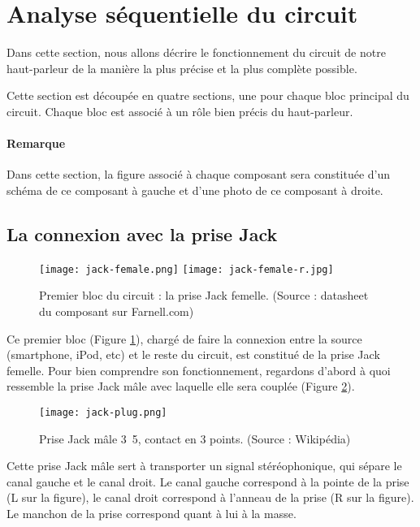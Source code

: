 

\section{Analyse séquentielle du circuit}
Dans cette section, nous allons décrire le fonctionnement du circuit
de notre haut-parleur de la manière la plus précise et la plus complète
possible. 

Cette section est découpée en quatre sections, une pour chaque bloc 
principal du circuit. Chaque bloc est associé à un rôle bien précis du
haut-parleur.

\paragraph{Remarque}
Dans cette section, la figure associé à chaque composant sera constituée
d'un schéma de ce composant à gauche et d'une photo de ce composant à droite.

\subsection{La connexion avec la prise Jack}

\begin{figure}[!hbt]
	\centering
	\texttt{[image: jack-female.png]}
	\texttt{[image: jack-female-r.jpg]}
	\caption{Premier bloc du circuit :
					la prise Jack femelle. (Source : datasheet du composant sur Farnell.com)}
	\label{jack-female}
\end{figure}

Ce premier bloc (Figure \ref{jack-female}), chargé de faire la connexion 
entre la source (smartphone, iPod, etc) et le reste du circuit, est constitué de la prise Jack femelle. 
Pour bien comprendre son fonctionnement, regardons d'abord à quoi ressemble la prise Jack
mâle avec laquelle elle sera couplée (Figure \ref{jack-plug}).

\begin{figure}[!hbt]
	\centering
	\texttt{[image: jack-plug.png]}
	\caption{Prise Jack mâle \unit{3.5}{\milli\meter}, contact en 3 points. (Source : Wikipédia)}
	\label{jack-plug}
\end{figure}

Cette prise Jack mâle sert à transporter un signal stéréophonique, qui sépare le 
canal gauche et le canal droit. Le canal gauche correspond à la pointe de la prise 
(L sur la figure), le canal droit correspond à l'anneau de la prise (R sur la figure). 
Le manchon de la prise correspond quant à lui à la masse.

